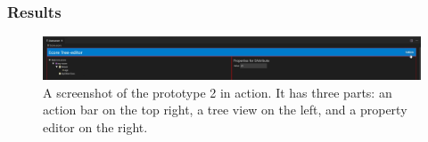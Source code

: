 


\subsubsection{Results}

\begin{figure}[htbp]
  \centering
  \includegraphics[width=\textwidth]{figures/prototype-2-screenshot.png}
  \caption[Prototype 2 Screenshot]{A screenshot of the prototype 2 in action. It has three parts: an action bar on the top right, a tree view on the left, and a property editor on the right.}\label{fig:prototype-2-screenshot}
\end{figure}
